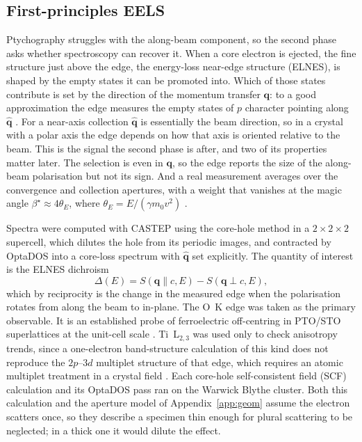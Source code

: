 \documentclass[aps,prb,twocolumn,superscriptaddress,floatfix,nofootinbib]{revtex4-2}
\begin{document}
\subsection{First-principles EELS}
\label{sec:eels-method}

Ptychography struggles with the along-beam component, so the second phase asks whether spectroscopy can recover it. When a core electron is ejected, the fine structure just above the edge, the energy-loss near-edge structure (ELNES), is shaped by the empty states it can be promoted into. Which of those states contribute is set by the direction of the momentum transfer $\mathbf{q}$: to a good approximation the edge measures the empty states of $p$ character pointing along $\hat{\mathbf{q}}$ \citep{Egerton2011,Nelhiebel1999}. For a near-axis collection $\hat{\mathbf{q}}$ is essentially the beam direction, so in a crystal with a polar axis the edge depends on how that axis is oriented relative to the beam. This is the signal the second phase is after, and two of its properties matter later. The selection is even in $\mathbf{q}$, so the edge reports the size of the along-beam polarisation but not its sign. And a real measurement averages over the convergence and collection apertures, with a weight that vanishes at the magic angle $\beta^\star\approx4\theta_E$, where $\theta_E=E/(\gamma m_0v^2)$ \citep{Jouffrey2004}.

Spectra were computed with CASTEP \citep{Clark2005} using the core-hole method \citep{Gao2008} in a $2\times2\times2$ supercell, which dilutes the hole from its periodic images, and contracted by OptaDOS \citep{Morris2014} into a core-loss spectrum with $\hat{\mathbf{q}}$ set explicitly. The quantity of interest is the ELNES dichroism
\begin{equation}
  \Delta(E) = S(\mathbf{q}\!\parallel\!c,E) - S(\mathbf{q}\!\perp\!c,E),
  \label{eq:dichroism}
\end{equation}
which by reciprocity is the change in the measured edge when the polarisation rotates from along the beam to in-plane. The O~K edge was taken as the primary observable. It is an established probe of ferroelectric off-centring in PTO/STO superlattices at the unit-cell scale \citep{TorresPardo2011}. Ti~L$_{2,3}$ was used only to check anisotropy trends, since a one-electron band-structure calculation of this kind does not reproduce the $2p$--$3d$ multiplet structure of that edge, which requires an atomic multiplet treatment in a crystal field \citep{deGroot1990}. Each core-hole self-consistent field (SCF) calculation and its OptaDOS pass ran on the Warwick Blythe cluster. Both this calculation and the aperture model of Appendix~\ref{app:geom} assume the electron scatters once, so they describe a specimen thin enough for plural scattering to be neglected; in a thick one it would dilute the effect.
\end{document}
